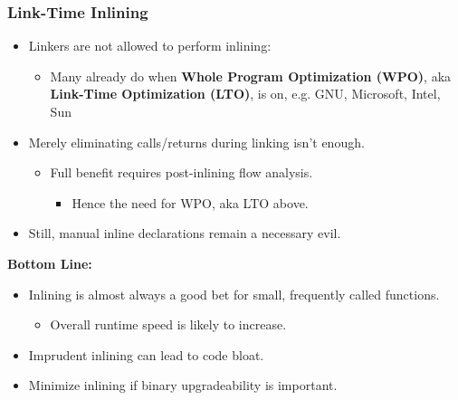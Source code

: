 \subsubsection{Link-Time Inlining}
\begin{itemize}
	\item Linkers are not allowed to perform inlining:
	\begin{itemize}
		\item Many already do when \textbf{Whole Program Optimization (WPO)}, aka \textbf{Link-Time Optimization (LTO)}, is on, e.g. GNU, Microsoft, Intel, Sun
	\end{itemize}
	\item Merely eliminating calls/returns during linking isn't enough.
	\begin{itemize}
		\item Full benefit requires post-inlining flow analysis.
		\begin{itemize}
			\item Hence the need for WPO, aka LTO above.
		\end{itemize}
	\end{itemize}
	\item Still, manual inline declarations remain a necessary evil.
\end{itemize}
\textbf{Bottom Line:}\\
\begin{itemize}
	\item Inlining is almost always a good bet for small, frequently called functions.
	\begin{itemize}
		\item Overall runtime speed is likely to increase.
	\end{itemize}
	\item Imprudent inlining can lead to code bloat.
	\item Minimize inlining if binary upgradeability is important.
\end{itemize}




